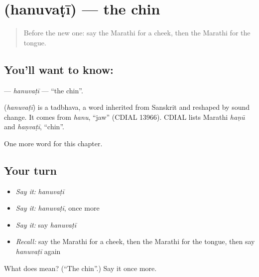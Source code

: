 \section[\texorpdfstring{\mr{हनुवटी} (hanuvaṭī)}{हनुवटी (hanuvaṭī)}]{ (hanuvaṭī) — the chin}

\label{lesson:MR-C145-hanuvati}



\begin{quote}
Before the new one: say the Marathi for a cheek, then the Marathi for the tongue.
\end{quote}

\subsection*{You'll want to know: }
\textbf{} — \emph{hanuvaṭī} — \textquotedblleft{}the chin\textquotedblright{}.

\begin{cousinweb}
\textbf{} (\emph{hanuvaṭī}) is a tadbhava, a word inherited from Sanskrit and reshaped by sound change. It comes from \emph{hanu}, \textquotedblleft{}jaw\textquotedblright{} (CDIAL 13966). CDIAL lists Marathi \emph{haṇū} and \emph{haṇvaṭī}, \textquotedblleft{}chin\textquotedblright{}.
\end{cousinweb}

\begin{grammarlens}[title={What you've built}]
One more word for this chapter.
\end{grammarlens}

\subsection*{Your turn}
\begin{itemize}
\raggedright
  \item \emph{Say it:} \emph{hanuvaṭī}
  \item \emph{Say it:} \emph{hanuvaṭī}, once more
  \item \emph{Say it:} say \emph{hanuvaṭī}
  \item \emph{Recall:} say the Marathi for a cheek, then the Marathi for the tongue, then say \emph{hanuvaṭī} again
\end{itemize}

\begin{tcolorbox}[breakable,colback=teal!4,colframe=teal!35!black,title={Before you move on}]
What does  mean? (\textquotedblleft{}The chin\textquotedblright{}.) Say it once more.
\end{tcolorbox}
